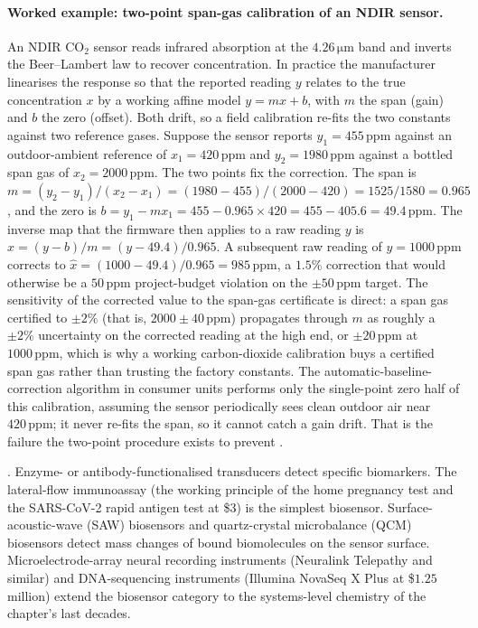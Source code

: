 \paragraph{Worked example: two-point span-gas calibration of an
NDIR sensor.} An NDIR $\mathrm{CO}_{2}$ sensor reads infrared
absorption at the $4.26 \,\si{\micro\meter}$ band and inverts the
Beer--Lambert law to recover concentration. In practice the
manufacturer linearises the response so that the reported reading
$y$ relates to the true concentration $x$ by a working affine model
$y = m x + b$, with $m$ the span (gain) and $b$ the zero (offset).
Both drift, so a field calibration re-fits the two constants against
two reference gases. Suppose the sensor reports $y_{1} = 455 \,\text
{ppm}$ against an outdoor-ambient reference of $x_{1} = 420 \,\text
{ppm}$ and $y_{2} = 1980 \,\text{ppm}$ against a bottled span gas of
$x_{2} = 2000 \,\text{ppm}$. The two points fix the correction. The
span is $m = (y_{2} - y_{1})/(x_{2} - x_{1}) = (1980 - 455)/
(2000 - 420) = 1525/1580 = 0.965$, and the zero is
$b = y_{1} - m x_{1} = 455 - 0.965 \times 420 = 455 - 405.6 =
49.4 \,\text{ppm}$. The inverse map that the firmware then applies to
a raw reading $y$ is $\hat{x} = (y - b)/m = (y - 49.4)/0.965$. A
subsequent raw reading of $y = 1000 \,\text{ppm}$ corrects to
$\hat{x} = (1000 - 49.4)/0.965 = 985 \,\text{ppm}$, a $1.5\%$
correction that would otherwise be a $50 \,\text{ppm}$ project-budget
violation on the $\pm 50 \,\text{ppm}$ target. The sensitivity of the
corrected value to the span-gas certificate is direct: a span gas
certified to $\pm 2\%$ (that is, $2000 \pm 40 \,\text{ppm}$)
propagates through $m$ as roughly a $\pm 2\%$ uncertainty on the
corrected reading at the high end, or $\pm 20 \,\text{ppm}$ at
$1000 \,\text{ppm}$, which is why a working carbon-dioxide
calibration buys a certified span gas rather than trusting the
factory constants. The automatic-baseline-correction algorithm in
consumer units performs only the single-point zero half of this
calibration, assuming the sensor periodically sees clean outdoor
air near $420 \,\text{ppm}$; it never re-fits the span, so it cannot
catch a gain drift. That is the failure the two-point procedure
exists to prevent \cite{std:ch05-jcgm-100}.

. Enzyme- or antibody-functionalised
transducers detect specific biomarkers. The lateral-flow
immunoassay (the working principle of the home pregnancy test
and the SARS-CoV-2 rapid antigen test at \$$3$) is the simplest
biosensor. Surface-acoustic-wave (SAW) biosensors and
quartz-crystal microbalance (QCM) biosensors detect mass changes
of bound biomolecules on the sensor surface. Microelectrode-array
neural recording instruments (Neuralink Telepathy and similar) and
DNA-sequencing instruments (Illumina NovaSeq X Plus at \$$1.25$
million) extend the biosensor category to the systems-level
chemistry of the chapter's last decades.


